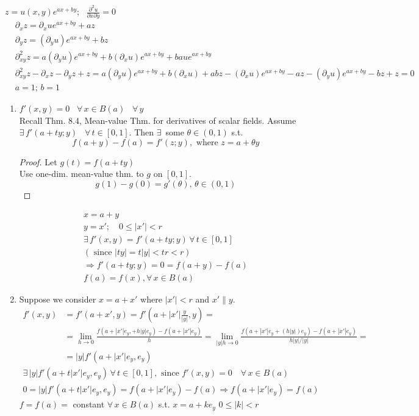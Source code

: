 \documentclass[twoside]{amsart}
\theoremstyle{plain}
\theoremstyle{definition}
\newcommand{\exercisehead}[1]
  {
   \noindent{\small\bf Exercise #1.}
   \smallskip}
\begin{document}
\exercisehead{19} $z = u(x,y) e^{ax+by}$; \, $\frac{\partial^2 u}{ \partial x \partial y} = 0$ 
\[
\begin{aligned}
  & \partial_x z = \partial_x u e^{ax + by} + az \\
  & \partial_y z = (\partial_y u)e^{ax + by} + bz \\
  & \partial_{xy}^2 z = a(\partial_y u) e^{ax+by} + b(\partial_x u) e^{ax+ by} + bau e^{ax+by} \\
  & \partial_{xy}^2 z - \partial_x z - \partial_y z + z = a (\partial_y u )e^{ax + by} + b(\partial_x u )+abz - (\partial_x u)e^{ax+ by} - az - (\partial_y u) e^{ax+by} - bz + z = 0  \\
  & \boxed{ a = 1; \, b=1 }
\end{aligned}
\]

\exercisehead{20} 
\begin{enumerate}
\item $f'(x,y) = 0$ \, $\forall \, x \in B(a)$ \, $\forall \, y$ \\
Recall Thm. 8.4, Mean-value Thm. for derivatives of scalar fields.  Assume $\exists \, f'(a+ty;y)$ \, $\forall \, t \in [0,1]$.  Then $\exists \, $ some $\theta \in (0,1)$ s.t. 
\[
f(a+y) - f(a) = f'(z;y), \text{ where } z = a+\theta y
\]
\begin{proof}
  Let $g(t) = f(a+ty)$ \\
  \phantom{ Let } Use one-dim. mean-value thm. to $g$ on $[0,1]$. 
\[
g(1) - g(0) = g'(\theta), \, \theta \in (0,1)
\]
\end{proof}
\[
\begin{gathered}
  x = a +y \\
  y = x'; \quad 0 \leq |x'| < r \\
  \exists \, f'(x,y) = f'(a+ty;y) \, \forall \, t \in [0,1] \\
  (\text{ since } |ty| = t|y| < tr < r ) \\
  \Longrightarrow f'(a+ty; y) = 0 = f(a+y) - f(a) \\
  f(a) = f(x), \forall \, x \in B(a)
\end{gathered}
\]
\item Suppose we consider $x = a+ x'$ where $|x'| < r$ and $x' \parallel y$.  
\[
\begin{aligned}
  f'(x,y) & = f'(a+x',y) = f'(a+|x'|\frac{y}{|y|},y ) = \\
  & = \lim_{h \to 0} \frac{ f(a+ |x'|e_y, +h|y|e_y ) - f(a + |x'|e_y ) }{ h }  = \lim_{ |y|h \to 0} \frac{ f(a+ |x'|e_y + (h|y| )e_y ) - f(a + |x'|e_y) }{ h|y|/|y| } = \\
  & = |y| f'(a+ |x'|e_y, e_y)
\end{aligned}
\]
\[
\begin{gathered}
  \exists \, |y| f'(a + t|x'| e_y, e_y) \, \forall \, t \in [0,1], \text{ since } f'(x,y) = 0 \quad \forall \, x \in B(a) \\
  0 = |y| f'(a+ t |x'|e_y,e_y) = f(a+ |x'|e_y) - f(a) \Longrightarrow f(a+|x'|e_y) = f(a)
\end{gathered}
\]
$f = f(a) = $ constant $\forall \, x \in B(a)$ s.t. $x= a+ke_y$ \quad $0 \leq |k| < r$
\end{enumerate}
\end{document}
